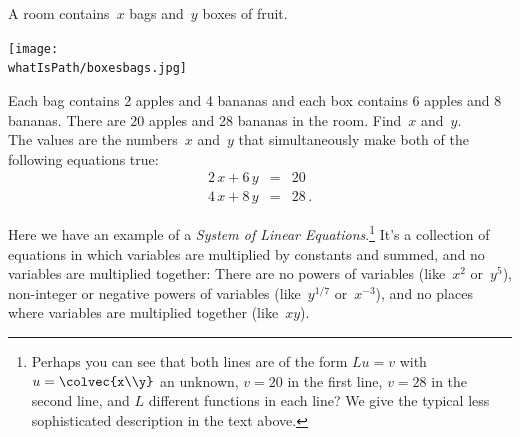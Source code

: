 \begin{example} 
A room contains~$x$ bags and~$y$ boxes of fruit.
\begin{center}
\texttt{[image: \\whatIsPath/boxesbags.jpg]}
\end{center}
Each bag contains 2 apples and 4 bananas and each box contains 6 apples and 8 bananas. 
There are 20 apples and 28 bananas in the room. Find~$x$ and~$y$.
\\


\noindent
The values are the numbers~$x$ and~$y$ that simultaneously make both of the following equations true:
\begin{eqnarray*}
	2\, x + 6\, y & =  & 20 \\
	4\, x + 8\, y & = & 28\, .
\end{eqnarray*}
\end{example}
Here we have an example of a \emph{System of Linear Equations}.\footnote{Perhaps you can see that both lines are of the form $Lu=v$ with $u=\colvec{x\\y}$ an unknown, $v=20$ in the first line, $v=28$ in the second line, and $L$ different functions in each line? We give the typical less sophisticated description in the text above.}   
It's a collection of equations in which variables are multiplied by constants and summed, and no variables are multiplied together:  There are no powers of variables 
(like~$x^2$ or~$y^5$), non-integer or negative powers of variables (like~$y^{1/7}$ or~$x^{-3}$), and no places where variables are multiplied together (like~$xy$).


